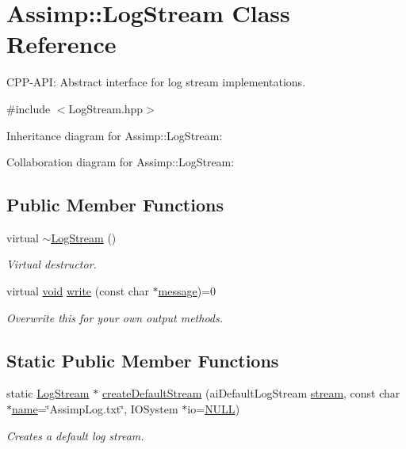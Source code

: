 \hypertarget{class_assimp_1_1_log_stream}{\section{Assimp\-:\-:Log\-Stream Class Reference}
\label{class_assimp_1_1_log_stream}
}


C\-P\-P-\/\-A\-P\-I\-: Abstract interface for log stream implementations.  




{\ttfamily \#include $<$Log\-Stream.\-hpp$>$}



Inheritance diagram for Assimp\-:\-:Log\-Stream\-:


Collaboration diagram for Assimp\-:\-:Log\-Stream\-:
\subsection*{Public Member Functions}
\begin{DoxyCompactItemize}
\item 
virtual \hyperlink{class_assimp_1_1_log_stream_a72cabcadc78dcbdd54b5641703057ee7}{$\sim$\-Log\-Stream} ()
\begin{DoxyCompactList}\small\item\em Virtual destructor. \end{DoxyCompactList}\item 
virtual \hyperlink{_s_d_l__opengl_8h_a3db05964a3cc4410f35b7ea2b7eb850d}{void} \hyperlink{class_assimp_1_1_log_stream_ab0bfcb5ab9988ef65d7222a50f6e8d37}{write} (const char $\ast$\hyperlink{_g_l_e_w_2glew_8h_ab5d4c2bfcb78f279c688575297d42f74}{message})=0
\begin{DoxyCompactList}\small\item\em Overwrite this for your own output methods. \end{DoxyCompactList}\end{DoxyCompactItemize}
\subsection*{Static Public Member Functions}
\begin{DoxyCompactItemize}
\item 
static \hyperlink{class_assimp_1_1_log_stream}{Log\-Stream} $\ast$ \hyperlink{class_assimp_1_1_log_stream_a6b358a4a79b2e9ba2025e10d3e9405e3}{create\-Default\-Stream} (ai\-Default\-Log\-Stream \hyperlink{_g_l_e_w_2glew_8h_a10d3bc96cdfc1d478f52c13d5ffd9316}{stream}, const char $\ast$\hyperlink{_g_l_e_w_2glew_8h_aaced7cfc21e7d37775d6921bb8177239}{name}=\char`\"{}Assimp\-Log.\-txt\char`\"{}, I\-O\-System $\ast$io=\hyperlink{begin__code_8h_a070d2ce7b6bb7e5c05602aa8c308d0c4}{N\-U\-L\-L})
\begin{DoxyCompactList}\small\item\em Creates a default log stream. \end{DoxyCompactList}\end{DoxyCompactItemize}
